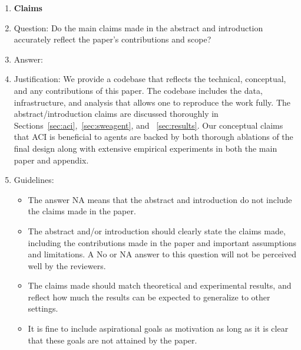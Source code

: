 
\begin{enumerate}

\item {\bf Claims}
    \item[] Question: Do the main claims made in the abstract and introduction accurately reflect the paper's contributions and scope?
    \item[] Answer: \answerYes{}
    \item[] Justification: We provide a codebase that reflects the technical, conceptual, and any contributions of this paper.
    The codebase includes the data, infrastructure, and analysis that allows one to reproduce the work fully.
    The abstract/introduction claims are discussed thoroughly in Sections~\ref{sec:aci},~\ref{sec:sweagent}, and ~\ref{sec:results}.
    Our conceptual claims that ACI is beneficial to agents are backed by both thorough ablations of the final design along with extensive empirical experiments in both the main paper and appendix.
    \item[] Guidelines:
    \begin{itemize}
        \item The answer NA means that the abstract and introduction do not include the claims made in the paper.
        \item The abstract and/or introduction should clearly state the claims made, including the contributions made in the paper and important assumptions and limitations. A No or NA answer to this question will not be perceived well by the reviewers. 
        \item The claims made should match theoretical and experimental results, and reflect how much the results can be expected to generalize to other settings. 
        \item It is fine to include aspirational goals as motivation as long as it is clear that these goals are not attained by the paper. 
    \end{itemize}


\end{enumerate}
